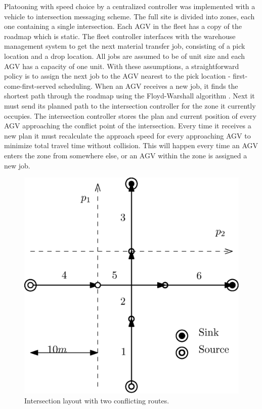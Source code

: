 \documentclass[]{article}
\begin{document}
Platooning with speed choice by a centralized controller was implemented with a vehicle to intersection messaging scheme. The full site is divided into zones, each one containing a single intersection. Each AGV in the fleet has a copy of the roadmap which is  static. The fleet controller interfaces with the warehouse management system to get the next material transfer job, consisting of a pick location and a drop location. All jobs are assumed to be of unit size and each AGV has a capacity of one unit. With these assumptions, a straightforward policy is to assign the next job to the AGV nearest to the pick location - first-come-first-served scheduling. When an AGV receives a new job, it finds the shortest path through the roadmap using the Floyd-Warshall algorithm \cite{Djojo2013}. Next it must send its planned path to the intersection controller for the zone it currently occupies. The intersection controller stores the plan and current position of every AGV approaching the conflict point of the intersection. Every time it receives a new plan it must recalculate the approach speed for every approaching AGV to minimize total travel time without collision. This will happen every time an AGV enters the zone from somewhere else, or an AGV within the zone is assigned a new job.

\begin{figure}[ht]
	\centering
	\includegraphics[width=0.9\linewidth]{intersection_topo}
	\caption{Intersection layout with two conflicting routes.}
	\label{fig:layout}
\end{figure}
\end{document}
